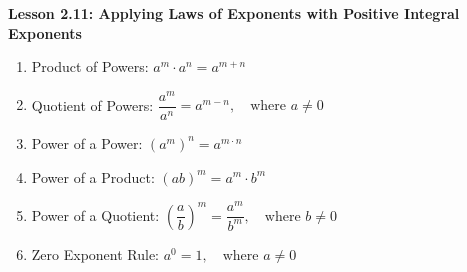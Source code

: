 \begin{center}
\textbf{Lesson 2.11: Applying Laws of Exponents with Positive Integral Exponents}
\end{center}

\vspace*{1ex}

\begin{enumerate}[noitemsep, label = \color{blue}\arabic*. ]
    \item  Product of Powers: \( a^m \cdot a^n = a^{m+n} \)
    \item  Quotient of Powers: \( \dfrac{a^m}{a^n} = a^{m-n}, \quad \text{where } a \neq 0 \)
    \item  Power of a Power: \( (a^m)^n = a^{m \cdot n} \)
    \item  Power of a Product: \( (ab)^m = a^m \cdot b^m \)
    \item  Power of a Quotient: \( \left( \dfrac{a}{b} \right)^m = \dfrac{a^m}{b^m}, \quad \text{where } b \neq 0 \)
    \item  Zero Exponent Rule: \( a^0 = 1, \quad \text{where } a \neq 0 \)
\end{enumerate}



